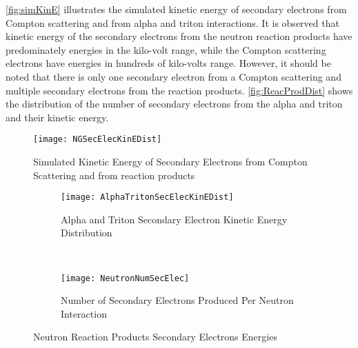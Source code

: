 \autoref{fig:simKinE} illustrates the simulated kinetic energy of secondary electrons from Compton scattering and from alpha and triton interactions.
It is observed that kinetic energy of the secondary electrons from the neutron reaction products have predominately energies in the kilo-volt range, while the Compton scattering electrons have energies in hundreds of kilo-volts range. 
However, it should be noted that there is only one secondary electron from a Compton scattering and multiple secondary electrons from the reaction products.
\autoref{fig:ReacProdDist} shows the distribution of the number of secondary electrons from the alpha and triton and their kinetic energy.
\begin{figure}[ht]
    \centering
    \texttt{[image: NGSecElecKinEDist]}
    \caption{Simulated Kinetic Energy of Secondary Electrons from Compton Scattering and from  reaction products}
    \label{fig:simKinE}
\end{figure}
\begin{figure*}[ht]
	\centering
	\begin{subfigure}[b]{0.45\textwidth}
    		\texttt{[image: AlphaTritonSecElecKinEDist]}
		\caption{Alpha and Triton Secondary Electron Kinetic Energy Distribution}
	\end{subfigure}%
	~
	\begin{subfigure}[b]{0.45\textwidth}
    		\texttt{[image: NeutronNumSecElec]}
		\caption{Number of Secondary Electrons Produced Per Neutron Interaction}
	\end{subfigure}%
	\caption{Neutron Reaction Products Secondary Electrons Energies}
	\label{fig:ReacProdDist}
\end{figure*}
